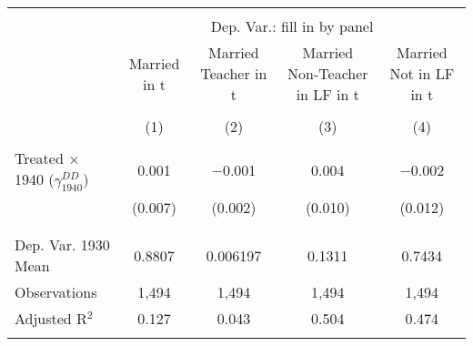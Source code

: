 
\begin{tabular}{@{\extracolsep{5pt}}lcccc} 
\\[-1.8ex]\hline 
\hline \\[-1.8ex] 
 & \multicolumn{4}{c}{Dep. Var.: fill in by panel} \\ 
\cline{2-5} 
 & Married in t & Married Teacher in t & Married Non-Teacher in LF in t & Married Not in LF in t \\ 
\\[-1.8ex] & (1) & (2) & (3) & (4)\\ 
\hline \\[-1.8ex] 
 Treated $\times$ 1940 ($\gamma_{1940}^{DD}$) & 0.001 & $-$0.001 & 0.004 & $-$0.002 \\ 
  & (0.007) & (0.002) & (0.010) & (0.012) \\ 
  & & & & \\ 
\hline \\[-1.8ex] 
Dep. Var. 1930 Mean & 0.8807 & 0.006197 & 0.1311 & 0.7434 \\ 
Observations & 1,494 & 1,494 & 1,494 & 1,494 \\ 
Adjusted R$^{2}$ & 0.127 & 0.043 & 0.504 & 0.474 \\ 
\hline 
\hline \\[-1.8ex] 
\end{tabular} 
